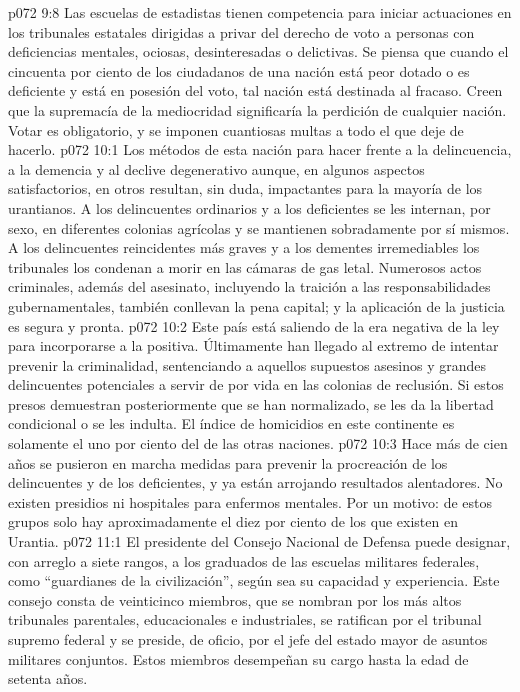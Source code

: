 \vs p072 9:8 Las escuelas de estadistas tienen competencia para iniciar actuaciones en los tribunales estatales dirigidas a privar del derecho de voto a personas con deficiencias mentales, ociosas, desinteresadas o delictivas. Se piensa que cuando el cincuenta por ciento de los ciudadanos de una nación está peor dotado o es deficiente y está en posesión del voto, tal nación está destinada al fracaso. Creen que la supremacía de la mediocridad significaría la perdición de cualquier nación. Votar es obligatorio, y se imponen cuantiosas multas a todo el que deje de hacerlo.
\vs p072 10:1 Los métodos de esta nación para hacer frente a la delincuencia, a la demencia y al declive degenerativo aunque, en algunos aspectos satisfactorios, en otros resultan, sin duda, impactantes para la mayoría de los urantianos. A los delincuentes ordinarios y a los deficientes se les internan, por sexo, en diferentes colonias agrícolas y se mantienen sobradamente por sí mismos. A los delincuentes reincidentes más graves y a los dementes irremediables los tribunales los condenan a morir en las cámaras de gas letal. Numerosos actos criminales, además del asesinato, incluyendo la traición a las responsabilidades gubernamentales, también conllevan la pena capital; y la aplicación de la justicia es segura y pronta.
\vs p072 10:2 Este país está saliendo de la era negativa de la ley para incorporarse a la positiva. Últimamente han llegado al extremo de intentar prevenir la criminalidad, sentenciando a aquellos supuestos asesinos y grandes delincuentes potenciales a servir de por vida en las colonias de reclusión. Si estos presos demuestran posteriormente que se han normalizado, se les da la libertad condicional o se les indulta. El índice de homicidios en este continente es solamente el uno por ciento del de las otras naciones.
\vs p072 10:3 Hace más de cien años se pusieron en marcha medidas para prevenir la procreación de los delincuentes y de los deficientes, y ya están arrojando resultados alentadores. No existen presidios ni hospitales para enfermos mentales. Por un motivo: de estos grupos solo hay aproximadamente el diez por ciento de los que existen en Urantia.
\vs p072 11:1 El presidente del Consejo Nacional de Defensa puede designar, con arreglo a siete rangos, a los graduados de las escuelas militares federales, como “guardianes de la civilización”, según sea su capacidad y experiencia. Este consejo consta de veinticinco miembros, que se nombran por los más altos tribunales parentales, educacionales e industriales, se ratifican por el tribunal supremo federal y se preside, de oficio, por el jefe del estado mayor de asuntos militares conjuntos. Estos miembros desempeñan su cargo hasta la edad de setenta años.
